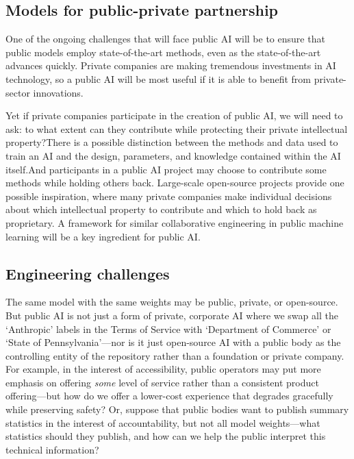 \documentclass{article}
\begin{document}
\subsection{Models for public-private partnership}

One of the ongoing challenges that will face public AI will be to ensure that public models employ state-of-the-art methods, even as the state-of-the-art advances quickly. Private companies are making tremendous investments in AI technology, so a public AI will be most useful if it is able to benefit from private-sector innovations.

Yet if private companies participate in the creation of public AI, we will need to ask: to what extent can they contribute while protecting their private intellectual property?There is a possible distinction between the methods and data used to train an AI and the design, parameters, and knowledge contained within the AI itself.And participants in a public AI project may choose to contribute some methods while holding others back. Large-scale open-source projects provide one possible inspiration, where many private companies make individual decisions about which intellectual property to contribute and which to hold back as proprietary. A framework for similar collaborative engineering in public machine learning will be a key ingredient for public AI.

\subsection{Engineering challenges}

The same model with the same weights may be public, private, or open-source. But public AI is not just a form of private, corporate AI where we swap all the `Anthropic' labels in the Terms of Service with `Department of Commerce' or `State of Pennsylvania'---nor is it just open-source AI with a public body as the controlling entity of the repository rather than a foundation or private company. For example, in the interest of accessibility, public operators may put more emphasis on offering \emph{some} level of service rather than a consistent product offering---but how do we offer a lower-cost experience that degrades gracefully while preserving safety? Or, suppose that public bodies want to publish summary statistics in the interest of accountability, but not all model weights---what statistics should they publish, and how can we help the public interpret this technical information?
\end{document}
